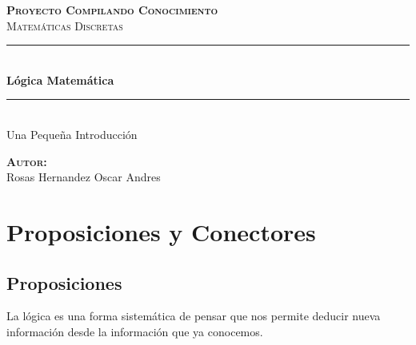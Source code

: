 \documentclass[12pt]{report}                                    %
\author{Oscar Andrés Rosas}                                     %
\begin{document}
\begin{titlepage}

	\center
	\textbf{\textsc{\Large Proyecto Compilando Conocimiento}}\\[1.0cm] 
	\textsc{\Large Matemáticas Discretas}\\[1.0cm] 

	\rule{\linewidth}{0.5mm} \\[1.0cm]
		{ \huge \bfseries Lógica Matemática}\\[1.0cm] 
	\rule{\linewidth}{0.5mm} \\[2.0cm]
	
	{\LARGE Una Pequeña Introducción}\\[7cm] 
	
	\begin{center} \large
	\textbf{\textsc{Autor:}}\\
	Rosas Hernandez Oscar Andres
	\end{center}

	\vfill

\end{titlepage}

\tableofcontents{}
\label{sec:Index}

\clearpage

\chapter{Proposiciones y Conectores}
    \clearpage

    \section{Proposiciones}

        La lógica es una forma sistemática de pensar que nos permite deducir nueva información desde la
        información que ya conocemos.
\end{document}
